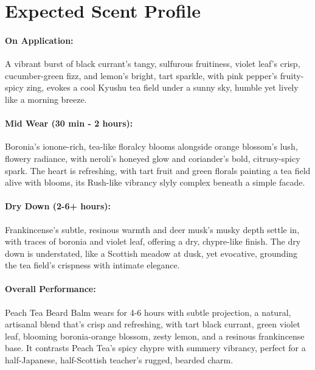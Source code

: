 \documentclass{article}
\begin{document}
\section*{Expected Scent Profile}

\paragraph{\textcolor{colaRed}{\textbf{On Application:}}}
A vibrant burst of black currant’s tangy, sulfurous fruitiness, violet leaf’s crisp, cucumber-green fizz, and lemon’s bright, tart sparkle, with pink pepper’s fruity-spicy zing, evokes a cool Kyushu tea field under a sunny sky, humble yet lively like a morning breeze.

\paragraph{\textcolor{colaBrown}{\textbf{Mid Wear (30 min - 2 hours):}}}
Boronia’s ionone-rich, tea-like floralcy blooms alongside orange blossom’s lush, flowery radiance, with neroli’s honeyed glow and coriander’s bold, citrusy-spicy spark. The heart is refreshing, with tart fruit and green florals painting a tea field alive with blooms, its Rush-like vibrancy slyly complex beneath a simple facade.

\paragraph{\textcolor{colaDark}{\textbf{Dry Down (2-6+ hours):}}}
Frankincense’s subtle, resinous warmth and deer musk’s musky depth settle in, with traces of boronia and violet leaf, offering a dry, chypre-like finish. The dry down is understated, like a Scottish meadow at dusk, yet evocative, grounding the tea field’s crispness with intimate elegance.

\paragraph{\textcolor{violetPurple}{\textbf{Overall Performance:}}}
Peach Tea Beard Balm wears for 4-6 hours with subtle projection, a natural, artisanal blend that’s crisp and refreshing, with tart black currant, green violet leaf, blooming boronia-orange blossom, zesty lemon, and a resinous frankincense base. It contrasts Peach Tea’s spicy chypre with summery vibrancy, perfect for a half-Japanese, half-Scottish teacher’s rugged, bearded charm.
\end{document}
